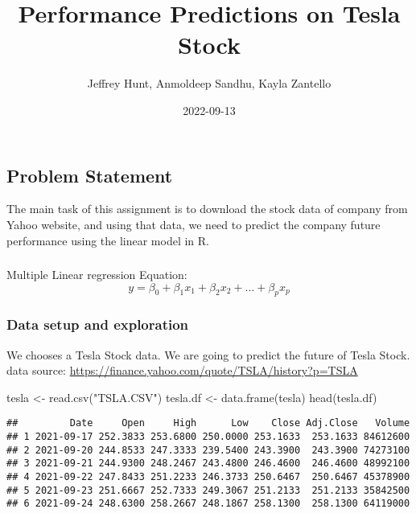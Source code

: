 \documentclass[
]{article}
\title{Performance Predictions on Tesla Stock}
\author{Jeffrey Hunt, Anmoldeep Sandhu, Kayla Zantello}
\date{2022-09-13}
\newenvironment{Shaded}{\begin{snugshade}}{\end{snugshade}}
\newcommand{\FunctionTok}[1]{\textcolor[rgb]{0.00,0.00,0.00}{#1}}
\newcommand{\NormalTok}[1]{#1}
\newcommand{\OtherTok}[1]{\textcolor[rgb]{0.56,0.35,0.01}{#1}}
\newcommand{\StringTok}[1]{\textcolor[rgb]{0.31,0.60,0.02}{#1}}
\begin{document}
\maketitle

\hypertarget{problem-statement}{%
\subsection{Problem Statement}\label{problem-statement}}

The main task of this assignment is to download the stock data of
company from Yahoo website, and using that data, we need to predict the
company future performance using the linear model in R.

\hypertarget{section}{%
\subsubsection{}\label{section}}

Multiple Linear regression Equation:
\[ y = \beta_0 + \beta_1 x_1+ \beta_2 x_2 + ...+ \beta_p x_p  \]

\hypertarget{data-setup-and-exploration}{%
\subsubsection{Data setup and
exploration}\label{data-setup-and-exploration}}

We chooses a Tesla Stock data. We are going to predict the future of
Tesla Stock. data source:
\url{https://finance.yahoo.com/quote/TSLA/history?p=TSLA}

\begin{Shaded}
\begin{Highlighting}[]
\NormalTok{tesla }\OtherTok{\textless{}{-}} \FunctionTok{read.csv}\NormalTok{(}\StringTok{"TSLA.CSV"}\NormalTok{)}
\NormalTok{tesla.df }\OtherTok{\textless{}{-}} \FunctionTok{data.frame}\NormalTok{(tesla)}
\FunctionTok{head}\NormalTok{(tesla.df)}
\end{Highlighting}
\end{Shaded}

\begin{verbatim}
##         Date     Open     High      Low    Close Adj.Close   Volume
## 1 2021-09-17 252.3833 253.6800 250.0000 253.1633  253.1633 84612600
## 2 2021-09-20 244.8533 247.3333 239.5400 243.3900  243.3900 74273100
## 3 2021-09-21 244.9300 248.2467 243.4800 246.4600  246.4600 48992100
## 4 2021-09-22 247.8433 251.2233 246.3733 250.6467  250.6467 45378900
## 5 2021-09-23 251.6667 252.7333 249.3067 251.2133  251.2133 35842500
## 6 2021-09-24 248.6300 258.2667 248.1867 258.1300  258.1300 64119000
\end{verbatim}
\end{document}
